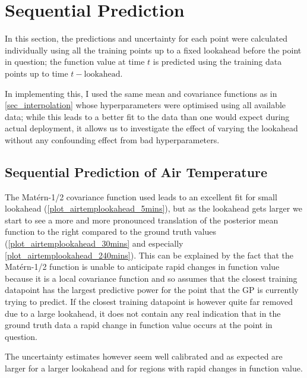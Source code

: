 \documentclass{article}
\begin{document}
    \section{Sequential Prediction}
            
            In this section, the predictions and uncertainty for each point were calculated individually using all the training points up to a fixed lookahead before the point in question; the function value at time $t$ is predicted using the training data points up to time $t-\textrm{lookahead}$.

            In implementing this, I used the same mean and covariance functions as in \cref{sec_interpolation} whose hyperparameters were optimised using all available data; while this leads to a better fit to the data than one would expect during actual deployment, it allows us to investigate the effect of varying the lookahead without any confounding effect from bad hyperparameters.

            \subsection{Sequential Prediction of Air Temperature} 

                The Matérn-1/2 covariance function used leads to an excellent fit for small lookahead (\cref{plot_airtemplookahead_5mins}), but as the lookahead gets larger we start to see a more and more pronounced translation of the posterior mean function to the right compared to the ground truth values (\cref{plot_airtemplookahead_30mins} and especially \cref{plot_airtemplookahead_240mins}). This can be explained by the fact that the Matérn-1/2 function is unable to anticipate rapid changes in function value because it is a local covariance function and so assumes that the closest training datapoint has the largest predictive power for the point that the GP is currently trying to predict. If the closest training datapoint is however quite far removed due to a large lookahead, it does not contain any real indication that in the ground truth data a rapid change in function value occurs at the point in question.

                The uncertainty estimates however seem well calibrated and as expected are larger for a larger lookahead and for regions with rapid changes in function value.
\end{document}
